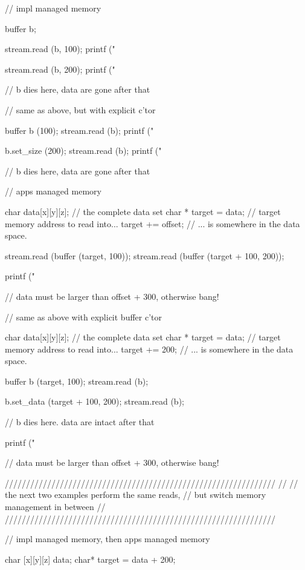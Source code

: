 \begin{mycode}
  // impl managed memory
  {
    {
      buffer b;
  
      stream.read (b, 100);
      printf ("%
      
      stream.read (b, 200);
      printf ("%
  
    } // b dies here, data are gone after that
  }
  
  
  // same as above, but with explicit c'tor
  {
    {
      buffer b (100);
      stream.read (b);
      printf ("%
  
      b.set_size (200);
      stream.read (b);
      printf ("%
  
    } // b dies here, data are gone after that
  }
  
  
  // apps managed memory
  {
    char   data[x][y][z]; // the complete data set
    char * target = data; // target memory address to read into...
    target += offset;     // ... is somewhere in the data space.
  
    stream.read (buffer (target,       100));
    stream.read (buffer (target + 100, 200));
  
    printf ("%
  
    // data must be larger than offset + 300, otherwise bang!
  }
  
  
  // same as above with explicit buffer c'tor
  {
    char   data[x][y][z]; // the complete data set
    char * target = data; // target memory address to read into...
    target += 200;          // ... is somewhere in the data space.
  
    {
      buffer b (target, 100);
      stream.read (b);
  
      b.set_data (target + 100, 200);
      stream.read (b);
  
    } // b dies here.  data are intact after that
  
    printf ("%
  
    // data must be larger than offset + 300, otherwise bang!
  }
  
  
  ////////////////////////////////////////////////////////////////
  //
  // the next two examples perform the same reads, 
  // but switch memory management in between
  //
  ////////////////////////////////////////////////////////////////
  
  // impl managed memory, then apps managed memory
  {
    {
      char [x][y][z] data;
      char* target = data + 200;
  
}}
\end{mycode}
